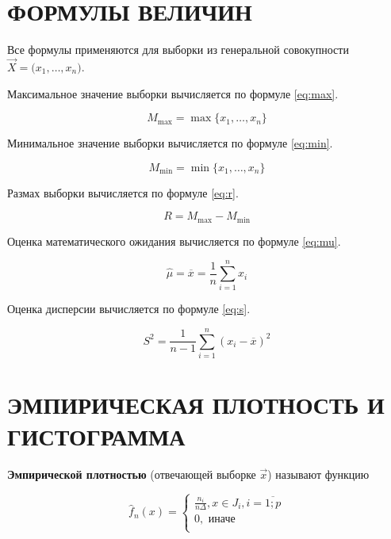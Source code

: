 \section{ФОРМУЛЫ ВЕЛИЧИН}

Все формулы применяются для выборки из генеральной совокупности
$\vec X = \big( x_1, \dots, x_n \big)$.

Максимальное значение выборки вычисляется по формуле \ref{eq:max}.

\begin{equation}\label{eq:max}
    M_{\max} = \max \{ x_1, \dots, x_n \}
\end{equation}

Минимальное значение выборки вычисляется по формуле \ref{eq:min}.

\begin{equation}\label{eq:min}
    M_{\min} = \min \{ x_1, \dots, x_n \}
\end{equation}

Размах выборки вычисляется по формуле \ref{eq:r}.

\begin{equation}\label{eq:r}
    R = M_{\max} - M_{\min}
\end{equation}

Оценка математического ожидания вычисляется по формуле \ref{eq:mu}.

\begin{equation}\label{eq:mu}
    \hat \mu = \overline x = \frac{1}{n} \sum_{i=1}^{n} x_i
\end{equation}

Оценка дисперсии вычисляется по формуле \ref{eq:s}.

\begin{equation}\label{eq:s}
    S^2 = \frac{1}{n-1} \sum_{i=1}^n (x_i - \overline{x})^2
\end{equation}

\section{ЭМПИРИЧЕСКАЯ ПЛОТНОСТЬ И ГИСТОГРАММА}

\textbf{Эмпирической плотностью}
(отвечающей выборке $\vec x$) называют функцию

\begin{equation*}
    \hat f_n(x) =
    \begin{cases}
        \frac{n_i}{n \Delta}, x \in J_i, i = \overline{1; p} \\
        0, \text{ иначе} \\
    \end{cases}
\end{equation*}

